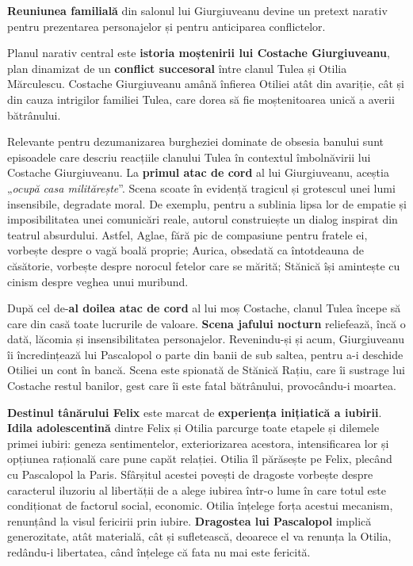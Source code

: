 \documentclass{article}
\newcommand{\qu}[1]{„\emph{#1}”}
\begin{document}
\textbf{Reuniunea familială} din salonul lui Giurgiuveanu devine un pretext narativ pentru prezentarea personajelor și pentru anticiparea conflictelor.

Planul narativ central este \textbf{istoria moștenirii lui Costache Giurgiuveanu}, plan dinamizat de un \textbf{conflict succesoral} între clanul Tulea și Otilia Mărculescu. Costache Giurgiuveanu amână înfierea Otiliei atât din avariție, cât și din cauza intrigilor familiei Tulea, care dorea să fie moștenitoarea unică a averii bătrânului.

Relevante pentru dezumanizarea burgheziei dominate de obsesia banului sunt episoadele care descriu reacțiile clanului Tulea în contextul îmbolnăvirii lui Costache Giurgiuveanu. La \textbf{primul atac de cord} al lui Giurgiuveanu, aceștia \qu{ocupă casa militărește}. Scena scoate în evidență tragicul și grotescul unei lumi insensibile, degradate moral. De exemplu, pentru a sublinia lipsa lor de empatie și imposibilitatea unei comunicări reale, autorul construiește un dialog inspirat din teatrul absurdului. Astfel, Aglae, fără pic de compasiune pentru fratele ei, vorbește despre o vagă boală proprie; Aurica, obsedată ca întotdeauna de căsătorie, vorbește despre norocul fetelor care se mărită; Stănică își amintește cu cinism despre veghea unui muribund.

După cel de-\textbf{al doilea atac de cord} al lui moș Costache, clanul Tulea începe să care din casă toate lucrurile de valoare. \textbf{Scena jafului nocturn} reliefează, încă o dată, lăcomia și insensibilitatea personajelor. Revenindu-și și acum, Giurgiuveanu îi încredințează lui Pascalopol o parte din banii de sub saltea, pentru a-i deschide Otiliei un cont în bancă. Scena este spionată de Stănică Rațiu, care îi sustrage lui Costache restul banilor, gest care îi este fatal bătrânului, provocându-i moartea.

\textbf{Destinul tânărului Felix} este marcat de \textbf{experiența inițiatică a iubirii}. \textbf{Idila adolescentină} dintre Felix și Otilia parcurge toate etapele și dilemele primei iubiri: geneza sentimentelor, exteriorizarea acestora, intensificarea lor și opțiunea rațională care pune capăt relației. Otilia îl părăsește pe Felix, plecând cu Pascalopol la Paris. Sfârșitul acestei povești de dragoste vorbește despre caracterul iluzoriu al libertății de a alege iubirea într-o lume în care totul este condiționat de factorul social, economic. Otilia înțelege forța acestui mecanism, renunțând la visul fericirii prin iubire. \textbf{Dragostea lui Pascalopol} implică generozitate, atât materială, cât și sufletească, deoarece el va renunța la Otilia, redându-i libertatea, când înțelege că fata nu mai este fericită.
\end{document}
